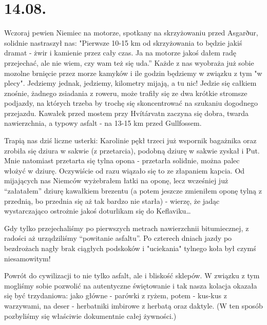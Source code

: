 \chapter*{14.08.}

Wczoraj pewien Niemiec na motorze, spotkany na skrzyżowaniu przed Asgarður, solidnie nastraszył nas: "Pierwsze 10-15 km od skrzyżowania to będzie jakiś dramat - żwir i kamienie przez cały czas. Ja na motorze jakoś dałem radę przejechać, ale nie wiem, czy wam też się uda.” Każde z nas wyobraża już sobie mozolne brnięcie przez morze kamyków i ile godzin będziemy w związku z tym "w plecy". Jedziemy jednak, jedziemy, kilometry mijają, a tu nic! Jedzie się całkiem znośnie, żadnego zsiadania z roweru, może trafiły się ze dwa krótkie stromsze podjazdy, na których trzeba by trochę się skoncentrować na szukaniu dogodnego przejazdu. Kawałek przed mostem przy Hvítárvatn zaczyna się dobra, twarda nawierzchnia, a typowy asfalt - na 13-15 km przed Gullfossem.


Trapią nas dziś liczne usterki: Karolinie pękł trzeci już wspornik bagażnika oraz zrobiła się dziura w sakwie (z przetarcia), podobną dziurę w sakwie zyskał i Put. Mnie natomiast przetarta się tylna opona - przetarła solidnie, można palec włożyć w dziurę. Oczywiście od razu wiązało się to ze złapaniem kapcia. Od mijających nas Niemców wyżebrałem łatki na oponę, lecz wcześniej już “załatałem” dziurę kawałkiem brezentu (a potem jeszcze zmieniłem oponę tylną z przednią, bo przednia się aż tak bardzo nie starła) - wierzę, że jadąc wystarczająco ostrożnie jakoś doturlikam się do Keflaviku…


Gdy tylko przejechaliśmy po pierwszych metrach nawierzchnii bitumiecznej, z radości aż urządziliśmy “powitanie asfaltu”. Po czterech dniach jazdy po bezdrożach nagły brak ciągłych podskoków i "uciekania" tylnego koła był czymś niesamowitym!

Powrót do cywilizacji to nie tylko asfalt, ale i bliskość sklepów. W związku z tym mogliśmy sobie pozwolić na autentyczne świętowanie i tak nasza kolacja okazała się być trzydaniowa: jako główne - parówki z ryżem, potem - kus-kus z warzywami, na deser - herbatniki imbirowe z herbatą oraz daktyle. (W ten sposób pozbyliśmy się właściwie dokumentnie całej żywności.)

